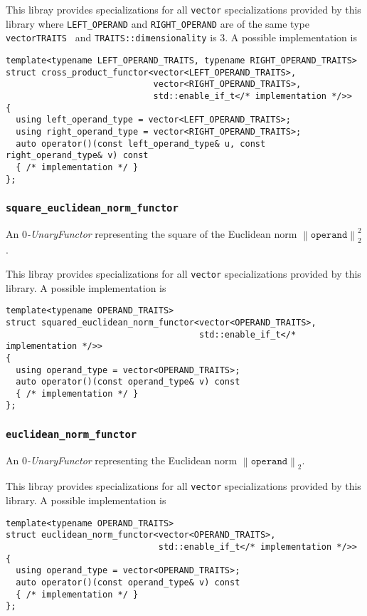 \documentclass[oneside]{book}
\begin{document}
\noindent{}This libray provides specializations for all \texttt{vector} specializations provided by this library
where \texttt{LEFT\_OPERAND} and \texttt{RIGHT\_OPERAND} are of the same type \texttt{vector\textlangle TRAITS \textrangle}
and \texttt{TRAITS::dimensionality} is $3$. A possible implementation is
\begin{verbatim}
template<typename LEFT_OPERAND_TRAITS, typename RIGHT_OPERAND_TRAITS>
struct cross_product_functor<vector<LEFT_OPERAND_TRAITS>,
                             vector<RIGHT_OPERAND_TRAITS>,
                             std::enable_if_t</* implementation */>>
{
  using left_operand_type = vector<LEFT_OPERAND_TRAITS>;
  using right_operand_type = vector<RIGHT_OPERAND_TRAITS>;
  auto operator()(const left_operand_type& u, const right_operand_type& v) const
  { /* implementation */ }
};
\end{verbatim}

\subsubsection{\texttt{square\_euclidean\_norm\_functor}}
An \textit{$0$-UnaryFunctor} representing the square of the Euclidean norm $\left\|\texttt{operand}\right\|^2_2$.\newline

\noindent{}This libray provides specializations for all \texttt{vector} specializations provided by this library.
A possible implementation is
\begin{verbatim}
template<typename OPERAND_TRAITS>
struct squared_euclidean_norm_functor<vector<OPERAND_TRAITS>,
                                      std::enable_if_t</* implementation */>>
{
  using operand_type = vector<OPERAND_TRAITS>;
  auto operator()(const operand_type& v) const
  { /* implementation */ }
};
\end{verbatim}

\subsubsection{\texttt{euclidean\_norm\_functor}}
An \textit{$0$-UnaryFunctor} representing the Euclidean norm $\left\|\texttt{operand}\right\|_2$.\newline

\noindent{}This libray provides specializations for all \texttt{vector} specializations provided by this library.
A possible implementation is
\begin{verbatim}
template<typename OPERAND_TRAITS>
struct euclidean_norm_functor<vector<OPERAND_TRAITS>,
                              std::enable_if_t</* implementation */>>
{
  using operand_type = vector<OPERAND_TRAITS>;
  auto operator()(const operand_type& v) const
  { /* implementation */ }
};
\end{verbatim}
\end{document}
